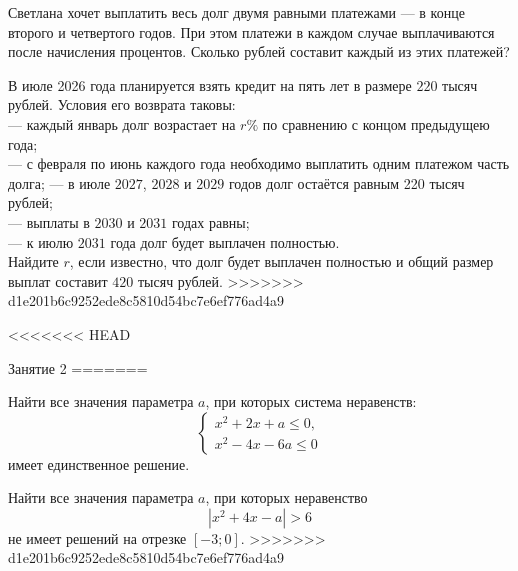 \begin{class}[number=1]
\begin{listofex}
		Светлана хочет выплатить весь долг двумя равными платежами --- в конце второго и четвертого годов.
		При этом платежи в каждом случае выплачиваются после начисления процентов.
		Сколько рублей составит каждый из этих платежей?
		\item В июле 2026 года планируется взять кредит на пять лет в размере \( 220 \) тысяч рублей.
		Условия его возврата таковы:\\
		--- каждый январь долг возрастает на \( r\% \) по сравнению с концом предыдущею года;\\
		--- с февраля по июнь каждого года необходимо выплатить одним платежом часть долга;
		--- в июле \( 2027 \), \( 2028 \) и \( 2029 \) годов долг остаётся равным 220 тысяч рублей;\\
		--- выплаты в \( 2030 \) и \( 2031 \) годах равны;\\
		--- к июлю \( 2031 \) года долг будет выплачен полностью.\\
		Найдите \( r \), если известно, что долг будет выплачен полностью и общий размер выплат составит \( 420 \) тысяч рублей.
>>>>>>> d1e201b6c9252ede8c5810d54bc7e6ef776ad4a9
	\end{listofex}
\end{class}

\begin{class}[number=2]
	\begin{listofex}
<<<<<<< HEAD
		\item Занятие 2
=======
		\item Найти все значения параметра \( a \), при которых система неравенств:
		\[ \begin{cases}
			x^2+2x+a\le0,\\
			x^2-4x-6a\le0
		\end{cases} \]
		имеет единственное решение.
		\item Найти все значения параметра \( a \), при которых неравенство
		\[ |x^2+4x-a| > 6 \]
		не имеет решений на отрезке \( [-3;0] \).
>>>>>>> d1e201b6c9252ede8c5810d54bc7e6ef776ad4a9
	\end{listofex}
\end{class}


